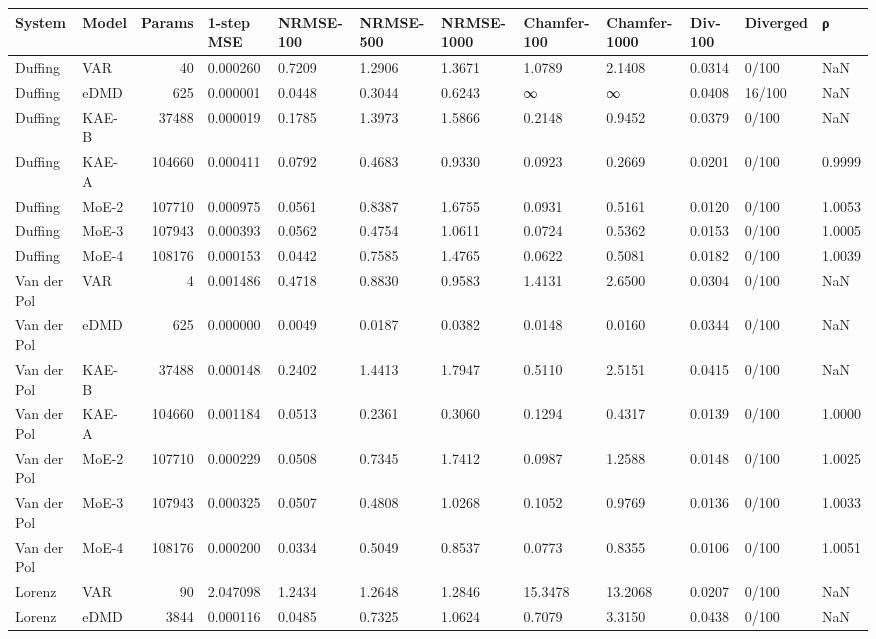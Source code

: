 \begin{tabular}{llrlllllllll}
\toprule
System & Model & Params & 1-step MSE & NRMSE-100 & NRMSE-500 & NRMSE-1000 & Chamfer-100 & Chamfer-1000 & Div-100 & Diverged & ρ \\
\midrule
Duffing & VAR & 40 & 0.000260 & 0.7209 & 1.2906 & 1.3671 & 1.0789 & 2.1408 & 0.0314 & 0/100 & NaN \\
Duffing & eDMD & 625 & 0.000001 & 0.0448 & 0.3044 & 0.6243 & ∞ & ∞ & 0.0408 & 16/100 & NaN \\
Duffing & KAE-B & 37488 & 0.000019 & 0.1785 & 1.3973 & 1.5866 & 0.2148 & 0.9452 & 0.0379 & 0/100 & NaN \\
Duffing & KAE-A & 104660 & 0.000411 & 0.0792 & 0.4683 & 0.9330 & 0.0923 & 0.2669 & 0.0201 & 0/100 & 0.9999 \\
Duffing & MoE-2 & 107710 & 0.000975 & 0.0561 & 0.8387 & 1.6755 & 0.0931 & 0.5161 & 0.0120 & 0/100 & 1.0053 \\
Duffing & MoE-3 & 107943 & 0.000393 & 0.0562 & 0.4754 & 1.0611 & 0.0724 & 0.5362 & 0.0153 & 0/100 & 1.0005 \\
Duffing & MoE-4 & 108176 & 0.000153 & 0.0442 & 0.7585 & 1.4765 & 0.0622 & 0.5081 & 0.0182 & 0/100 & 1.0039 \\
Van der Pol & VAR & 4 & 0.001486 & 0.4718 & 0.8830 & 0.9583 & 1.4131 & 2.6500 & 0.0304 & 0/100 & NaN \\
Van der Pol & eDMD & 625 & 0.000000 & 0.0049 & 0.0187 & 0.0382 & 0.0148 & 0.0160 & 0.0344 & 0/100 & NaN \\
Van der Pol & KAE-B & 37488 & 0.000148 & 0.2402 & 1.4413 & 1.7947 & 0.5110 & 2.5151 & 0.0415 & 0/100 & NaN \\
Van der Pol & KAE-A & 104660 & 0.001184 & 0.0513 & 0.2361 & 0.3060 & 0.1294 & 0.4317 & 0.0139 & 0/100 & 1.0000 \\
Van der Pol & MoE-2 & 107710 & 0.000229 & 0.0508 & 0.7345 & 1.7412 & 0.0987 & 1.2588 & 0.0148 & 0/100 & 1.0025 \\
Van der Pol & MoE-3 & 107943 & 0.000325 & 0.0507 & 0.4808 & 1.0268 & 0.1052 & 0.9769 & 0.0136 & 0/100 & 1.0033 \\
Van der Pol & MoE-4 & 108176 & 0.000200 & 0.0334 & 0.5049 & 0.8537 & 0.0773 & 0.8355 & 0.0106 & 0/100 & 1.0051 \\
Lorenz & VAR & 90 & 2.047098 & 1.2434 & 1.2648 & 1.2846 & 15.3478 & 13.2068 & 0.0207 & 0/100 & NaN \\
Lorenz & eDMD & 3844 & 0.000116 & 0.0485 & 0.7325 & 1.0624 & 0.7079 & 3.3150 & 0.0438 & 0/100 & NaN \\

\end{tabular}
